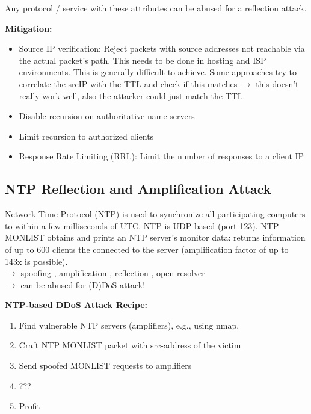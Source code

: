 \documentclass[11pt,oneside,a4paper]{article}
\begin{document}
Any protocol / service with these attributes can be abused for a reflection attack.

\noindent \textbf{Mitigation:}

\vspace{-\topsep}
\begin{itemize}
	\setlength{\itemsep}{0pt}
	\setlength{\parskip}{0pt}
	\item Source IP verification: Reject packets with source addresses not reachable via the actual packet’s	path. This needs to be done in hosting and ISP environments. This is generally difficult to achieve. Some approaches try to correlate the srcIP with the TTL and check if this matches $\rightarrow$ this doesn't really work well, also the attacker could just match the TTL.
	\item Disable recursion on authoritative name servers
	\item Limit recursion to authorized clients
	\item Response Rate Limiting (RRL): Limit the number of responses to a client IP
\end{itemize}
\vspace{-\topsep}


\subsection{NTP Reflection and Amplification Attack}

Network Time Protocol (NTP) is used to synchronize all participating computers to within a few milliseconds of UTC. NTP is UDP based (port 123). NTP MONLIST obtains and prints an NTP server's monitor data: returns information of up to 600 clients the connected to the server (amplification factor of up to 143x is possible).\\
$\rightarrow$ spoofing \checkmark, amplification \checkmark, reflection \checkmark, open resolver \checkmark\\
$\rightarrow$ can be abused for (D)DoS attack!

\noindent \textbf{NTP-based DDoS Attack Recipe:}

\vspace{-\topsep}
\begin{enumerate}
	\setlength{\itemsep}{0pt}
	\setlength{\parskip}{0pt}
	\item Find vulnerable NTP servers (amplifiers), e.g., using nmap.
	\item Craft NTP MONLIST packet with src-address of the victim
	\item Send spoofed MONLIST requests to amplifiers
	\item ???
	\item Profit
\end{enumerate}
\vspace{-\topsep}
\end{document}

